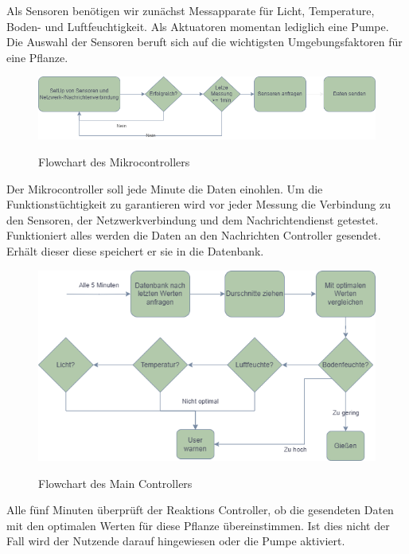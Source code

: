Als Sensoren benötigen wir zunächst Messapparate für Licht, Temperature, Boden- und Luftfeuchtigkeit. Als Aktuatoren momentan lediglich eine Pumpe. Die Auswahl der Sensoren beruft sich auf die wichtigsten Umgebungsfaktoren für eine Pflanze.\cite{oregonenvironmentfactors}

\begin{figure}[H]
\centering
\includegraphics[width=\textwidth]{images/Grobkonzept_MikroCont.png}
\caption{Flowchart des Mikrocontrollers}\cite{rainpoint_smart_timer}
\label{fig:rainpointDiagram}
\end{figure}

Der Mikrocontroller soll jede Minute die Daten einohlen. 
Um die Funktionstüchtigkeit zu garantieren wird vor jeder Messung die Verbindung zu den Sensoren, der Netzwerkverbindung und dem Nachrichtendienst getestet. 
Funktioniert alles werden die Daten an den Nachrichten Controller gesendet. Erhält dieser diese speichert er sie in die Datenbank.

\begin{figure}[H]
\centering
\includegraphics[width=\textwidth]{images/Grobkonzept_DatenCont.png}
\caption{Flowchart des Main Controllers}\cite{rainpoint_smart_timer}
\label{fig:rainpointDiagram}
\end{figure}

Alle fünf Minuten überprüft der Reaktions Controller, ob die gesendeten Daten mit den optimalen Werten für diese Pflanze übereinstimmen. 
Ist dies nicht der Fall wird der Nutzende darauf hingewiesen oder die Pumpe aktiviert.

